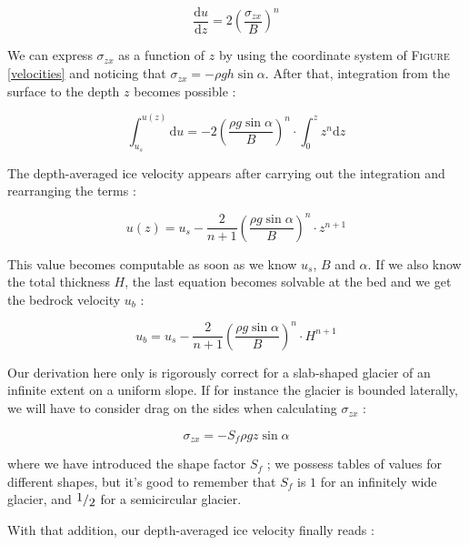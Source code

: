 \begin{equation}\frac{\mathrm{d} u}{\mathrm{d} z} = 2 \left( \frac{\sigma_{zx}}{B}\right)^n\end{equation}

We can express $\sigma_{zx}$ as a function of $z$ by using the coordinate system of \textsc{Figure} \ref{velocities} and noticing that $\sigma_{zx} = -\rho g h \sin{\alpha}$. After that, integration from the surface to the depth $z$ becomes possible :

\begin{equation}\int_{u_s}^{u(z)} \mathrm{d} u = -2 \left( \frac{\rho g \sin{\alpha}}{B}\right)^n \cdot \int_{0}^{z} z^n \mathrm{d} z\end{equation}


The depth-averaged ice velocity appears after carrying out the integration and rearranging the terms :

\begin{equation}u(z) = u_s - \frac{2}{n + 1} \left( \frac{\rho g \sin{\alpha}}{B}\right)^n \cdot z^{n+1}\end{equation}

This value becomes computable as soon as we know $u_s$, $B$ and $\alpha$. If we also know the total thickness $H$, the last equation becomes solvable at the bed and we get the bedrock velocity $u_b$ :

\begin{equation}u_b = u_s - \frac{2}{n + 1} \left( \frac{\rho g \sin{\alpha}}{B}\right)^n \cdot H^{n+1}\end{equation}

Our derivation here only is rigorously correct for a slab-shaped glacier of an infinite extent on a uniform slope. If for instance the glacier is bounded laterally, we will have to consider drag on the sides when calculating $\sigma_{zx}$ :

\begin{equation}\sigma_{zx} = -S_f \rho g z \sin{\alpha}\end{equation}

where we have introduced the shape factor $S_f$ ; we possess tables of values for different shapes, but it's good to remember that $S_f$ is $1$ for an infinitely wide glacier, and $\fraction{1}{2}$ for a semicircular glacier.

With that addition, our depth-averaged ice velocity finally reads :

\begin{center}
\end{center}


